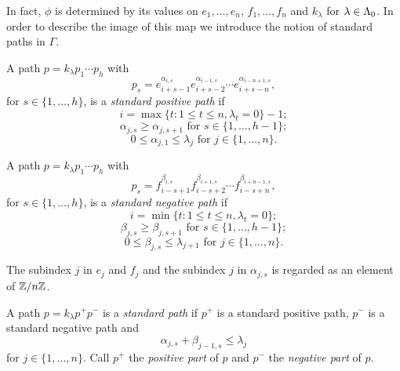 \documentclass[a4paper, 11pt]{report}
\begin{document}
In fact, $\phi$ is determined by its values on $e_1,\ldots,e_n$, $f_1,\ldots,f_n$ and $k_\lambda$ for $\lambda\in\Lambda_0{}$. In order to describe the image of this map we introduce the notion of standard paths in $\Gamma$.

\begin{definition}\label{def:standard-positive-path}
A path $p=k_\lambda p_1\cdots p_h$ with
\begin{equation*}
p_s = e_{i+s-1}^{\alpha_{i,s}} e_{i+s-2}^{\alpha_{i-1,s}}\cdots e_{i+s-n}^{\alpha_{i-n+1,s}},
\end{equation*}
for $s\in\{1,\ldots,h\}$, is a \emph{standard positive path} if
\begin{equation*}
i = \max\{t:1\le t\le n, \lambda_t = 0\} - 1;
\end{equation*}
\begin{equation*}
\alpha_{j,s}\geq \alpha_{j,s+1} \text{ for } s\in\{1,\ldots,h-1\};
\end{equation*}
\begin{equation*}
0\le \alpha_{j,1}\le\lambda_j \text{ for } j\in\{1,\ldots,n\}.
\end{equation*}
\end{definition}

\begin{definition}\label{def:standard-negative-path}
A path $p=k_\lambda p_1\cdots p_h$ with
\begin{equation*}
p_s = f_{i-s+1}^{\beta_{i,s}}f_{i-s+2}^{\beta_{i+1,s}}\cdots f_{i-s+n}^{\beta_{i+n-1,s}},
\end{equation*}
for $s\in\{1,\ldots,h\}$, is a \emph{standard negative path} if
\begin{equation*}
i = \min\{t:1\le t\le n, \lambda_t=0\};
\end{equation*}
\begin{equation*}
\beta_{j,s}\geq \beta_{j,s+1} \text{ for } s\in\{1,\ldots,h-1\};
\end{equation*}
\begin{equation*}
0\le \beta_{j,s}\le\lambda_{j+1} \text{ for } j\in\{1,\ldots,n\}.
\end{equation*}
\end{definition}

\begin{remark}
The subindex $j$ in $e_j$ and $f_j$ and the subindex $j$ in $\alpha_{j,s}$ is regarded as an element of $\mathbb{Z}/{n\mathbb{Z}}$.
\end{remark}

\begin{definition}\label{def:standard-paths}
A path $p=k_\lambda p^{+}p^{-}$ is a \emph{standard path} if $p^{+}$ is a standard positive path, $p^{-}$ is a standard negative path and
\begin{equation*}
\alpha_{j,s} + \beta_{j-1,s} \le \lambda_j
\end{equation*}
for $j\in\{1,\ldots,n\}$. Call $p^+$ the \emph{positive part} of $p$ and $p^-$ the \emph{negative part} of $p$.
\end{definition}
\end{document}
